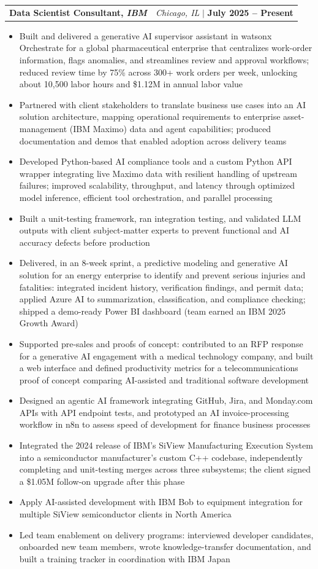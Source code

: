 \documentclass[letterpaper,10pt]{article}
\makeatletter
\newcommand{\resumeItem}[1]{
  \item\small{
    {#1 \vspace{-2pt}}
  }
}
\newcommand{\resumeSubheading}[4]{
  \item
  \begin{tabular*}{\textwidth}{l@{\extracolsep{\fill}}r}
    \textbf{#1, \small \emph{#3}} & \small{\emph{#4}} $|$ \small{\textbf{#2}} \\
  \end{tabular*}\vspace{-7pt}
}
\newcommand{\resumeItemListStart}{\begin{itemize}}
\newcommand{\resumeItemListEnd}{\end{itemize}\vspace{-5pt}}
\makeatother
\begin{document}
\resumeSubheading
  {Data Scientist Consultant}{July 2025 -- Present}
  {IBM}{Chicago, IL}
  \resumeItemListStart
    \resumeItem{Built and delivered a generative AI supervisor assistant in watsonx Orchestrate for a global pharmaceutical enterprise that centralizes work-order information, flags anomalies, and streamlines review and approval workflows; reduced review time by 75\% across 300+ work orders per week, unlocking about 10,500 labor hours and \$1.12M in annual labor value}
    \resumeItem{Partnered with client stakeholders to translate business use cases into an AI solution architecture, mapping operational requirements to enterprise asset-management (IBM Maximo) data and agent capabilities; produced documentation and demos that enabled adoption across delivery teams}
    \resumeItem{Developed Python-based AI compliance tools and a custom Python API wrapper integrating live Maximo data with resilient handling of upstream failures; improved scalability, throughput, and latency through optimized model inference, efficient tool orchestration, and parallel processing}
    \resumeItem{Built a unit-testing framework, ran integration testing, and validated LLM outputs with client subject-matter experts to prevent functional and AI accuracy defects before production}
    \resumeItem{Delivered, in an 8-week sprint, a predictive modeling and generative AI solution for an energy enterprise to identify and prevent serious injuries and fatalities: integrated incident history, verification findings, and permit data; applied Azure AI to summarization, classification, and compliance checking; shipped a demo-ready Power BI dashboard (team earned an IBM 2025 Growth Award)}
    \resumeItem{Supported pre-sales and proofs of concept: contributed to an RFP response for a generative AI engagement with a medical technology company, and built a web interface and defined productivity metrics for a telecommunications proof of concept comparing AI-assisted and traditional software development}
    \resumeItem{Designed an agentic AI framework integrating GitHub, Jira, and Monday.com APIs with API endpoint tests, and prototyped an AI invoice-processing workflow in n8n to assess speed of development for finance business processes}
    \resumeItem{Integrated the 2024 release of IBM's SiView Manufacturing Execution System into a semiconductor manufacturer's custom C++ codebase, independently completing and unit-testing merges across three subsystems; the client signed a \$1.05M follow-on upgrade after this phase}
    \resumeItem{Apply AI-assisted development with IBM Bob to equipment integration for multiple SiView semiconductor clients in North America}
    \resumeItem{Led team enablement on delivery programs: interviewed developer candidates, onboarded new team members, wrote knowledge-transfer documentation, and built a training tracker in coordination with IBM Japan}
  \resumeItemListEnd
\end{document}
